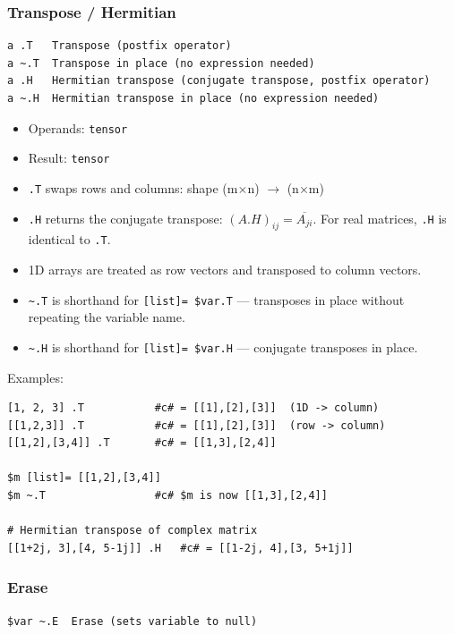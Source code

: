 \subsubsection{Transpose / Hermitian}
\begin{verbatim}
a .T   Transpose (postfix operator)
a ~.T  Transpose in place (no expression needed)
a .H   Hermitian transpose (conjugate transpose, postfix operator)
a ~.H  Hermitian transpose in place (no expression needed)
\end{verbatim}

\begin{itemize}
\item Operands: \texttt{tensor}
\item Result: \texttt{tensor}
\item \texttt{.T} swaps rows and columns: shape (m$\times$n) $\rightarrow$ (n$\times$m)
\item \texttt{.H} returns the conjugate transpose: $(A.H)_{ij} = \overline{A_{ji}}$. For real matrices, \texttt{.H} is identical to \texttt{.T}.
\item 1D arrays are treated as row vectors and transposed to column vectors.
\item \texttt{\textasciitilde.T} is shorthand for \texttt{[list]= \$var.T} — transposes in place without repeating the variable name.
\item \texttt{\textasciitilde.H} is shorthand for \texttt{[list]= \$var.H} — conjugate transposes in place.
\end{itemize}

Examples:
\begin{verbatim}
[1, 2, 3] .T           #c# = [[1],[2],[3]]  (1D -> column)
[[1,2,3]] .T           #c# = [[1],[2],[3]]  (row -> column)
[[1,2],[3,4]] .T       #c# = [[1,3],[2,4]]

$m [list]= [[1,2],[3,4]]
$m ~.T                 #c# $m is now [[1,3],[2,4]]

# Hermitian transpose of complex matrix
[[1+2j, 3],[4, 5-1j]] .H   #c# = [[1-2j, 4],[3, 5+1j]]
\end{verbatim}

\subsubsection{Erase}
\begin{verbatim}
$var ~.E  Erase (sets variable to null)
\end{verbatim}

